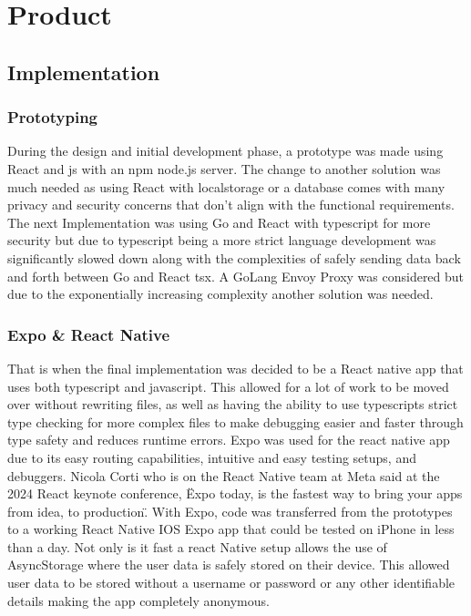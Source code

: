 \section{Product}\label{product}

\subsection{Implementation}

\subsubsection{Prototyping}
During the design and initial development phase, a prototype was made using React and js with an npm node.js server. The change to another solution was much needed as using React with localstorage or a database comes with many privacy and security concerns that don't align with the functional requirements. The next Implementation was using Go and React with typescript for more security but due to typescript being a more strict language development was significantly slowed down along with the complexities of safely sending data back and forth between Go and React tsx. A GoLang Envoy Proxy was considered but due to the exponentially increasing complexity another solution was needed. 

\subsubsection{Expo \& React Native}
That is when the final implementation was decided to be a React native app that uses both typescript and javascript. This allowed for a lot of work to be moved over without rewriting files, as well as having the ability to use typescripts strict type checking for more complex files to make debugging easier and faster through type safety and reduces runtime errors. Expo was used for the react native app due to its easy routing capabilities, intuitive and easy testing setups, and debuggers. Nicola Corti who is on the React Native team at Meta said at the 2024 React keynote conference, \"Expo today, is the fastest way to bring your apps from idea, to production\". With Expo, code was transferred from the prototypes to a working React Native IOS Expo app that could be tested on iPhone in less than a day. Not only is it fast a react Native setup allows the use of AsyncStorage where the user data is safely stored on their device. This allowed user data to be stored without a username or password or any other identifiable details making the app completely anonymous. 

